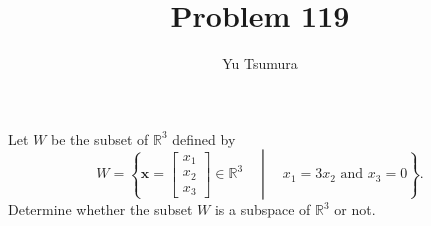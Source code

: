 \documentclass{ximera}
\title{Problem 119}
\author{Yu Tsumura}
\begin{document}
\begin{problem}
	 
	Let $W$ be the subset of $\mathbb{R}^3$ defined by
	\[W=\left\{ \mathbf{x}=\begin{bmatrix}
	  x_1 \\
	   x_2 \\
	    x_3 
	  \end{bmatrix} \in \mathbb{R}^3 \quad \middle| \quad x_1=3x_2 \text{ and } x_3=0 \right\}.\]
	  Determine whether the subset $W$ is a subspace of $\mathbb{R}^3$ or not.

          \begin{multipleChoice}
          \end{multipleChoice}
          
        \end{problem}
\end{document}
